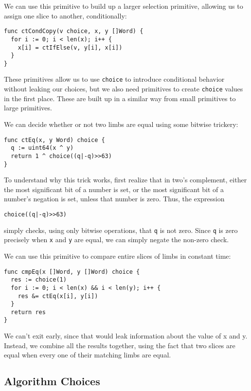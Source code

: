 \documentclass[11pt, a4paper]{article} %
\begin{document}
{We can use this primitive to build up a larger selection primitive,
allowing us to assign one slice to another, conditionally:

\begin{verbatim}
func ctCondCopy(v choice, x, y []Word) {
  for i := 0; i < len(x); i++ {
    x[i] = ctIfElse(v, y[i], x[i])
  }
}
\end{verbatim}

These primitives allow us to use \texttt{choice} to introduce conditional
behavior without leaking our choices, but we also need primitives to
create \texttt{choice} values in the first place. These are built up
in a similar way from small primitives to large primitives.

We can decide whether or not two limbs are equal using some bitwise
trickery:

\begin{verbatim}
func ctEq(x, y Word) choice {
  q := uint64(x ^ y)
  return 1 ^ choice((q|-q)>>63)
}
\end{verbatim}

To understand why this trick works, first realize that in two's complement,
either the most significant bit of a number is set, or the most significant
bit of a number's negation is set, unless that number is zero.
Thus, the expression
\begin{verbatim}
choice((q|-q)>>63)
\end{verbatim}
simply checks, using only bitwise operations, that
\texttt{q} is not zero.
Since \texttt{q} is zero precisely when \texttt{x} and \texttt{y}
are equal, we can simply negate the non-zero check.

We can use this primitive to compare entire slices of limbs
in constant time:

\begin{verbatim}
func cmpEq(x []Word, y []Word) choice {
  res := choice(1)
  for i := 0; i < len(x) && i < len(y); i++ {
    res &= ctEq(x[i], y[i])
  }
  return res
}
\end{verbatim}

We can't exit early, since that would leak information about
the value of x and y. Instead, we combine all the results together,
using the fact that two slices are equal when every one of their
matching limbs are equal.

\subsection{Algorithm Choices}


}
\end{document}

